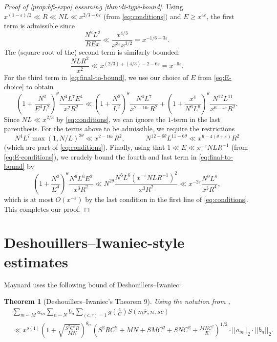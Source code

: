 \documentclass[reqno,11pt]{amsart}
\newtheorem{theorem}{Theorem}[section]
\theoremstyle{definition}
\theoremstyle{remark}
\numberwithin{equation}{section}
\newcommand{\eps}{\varepsilon}
\renewcommand{\bar}{\overline}
\begin{document}
\begin{proof}[Proof of \cref{prop:bfi-expo} assuming \cref{thm:di-type-bound}]
Using $x^{(1-\eps)/2} \ll R \ll NL \ll x^{2/3 - 6\eps}$ (from \cref{eq:conditions}) and $E \ge x^{4\eps}$, the first term is admissible since
\[
    \frac{N^2 L^2}{REx} \ll \frac{x^{4/3}}{x^{3\eps} x^{3/2}}
    =
    x^{-1/6 - 3\eps}.
\]
The (square root of the) second term is similarly bounded:
\[
    \frac{NL R^2}{x^2} \ll x^{(2/3) + (4/3) - 2 - 6\eps} = x^{- 6\eps}. 
\]
For the third term in \cref{eq:final-to-bound}, we use our choice of $E$ from \cref{eq:E-choice} to obtain
\[
    \left(1 + \frac{N^2}{E^4 L^2}\right)^{\theta} \frac{N^4 L^7 E^4}{x^2 R^2}
    \ll 
    \left(1 + \frac{N^2}{L^2}\right)^{\theta} \frac{N^4 L^7}{x^{2-16\eps} R^2}
    +
    \left(1 + \frac{x^4}{N^6 L^6}\right)^{\theta} \frac{N^{12} L^{11}}{x^{6-4\eps} R^2}.
\]
Since $NL \ll x^{2/3}$ by \cref{eq:conditions}, we can ignore the $1$-term in the last parenthesis. For the terms above to be admissible, we require the restrictions
\[
    N^4 L^7 \max(1, N/L)^{2\theta} \ll x^{2-16\eps}R^2, 
    \qquad\quad 
    N^{12-6\theta} L^{11-6\theta} \ll x^{6-4(\theta+\eps)} R^2
\]
(which are part of \cref{eq:conditions}). Finally, using that $1 \ll E \ll x^{-\eps} NLR^{-1}$ (from \cref{eq:E-conditions}), we crudely bound the fourth and last term in \cref{eq:final-to-bound} by
\[
    \left(1 + \frac{N^2}{E^4}\right)^{\theta} \frac{N^6 L^6 E^2}{x^3 R^2}
    \ll 
    N^{2\theta} \frac{N^6 L^6 (x^{-\eps}NLR^{-1})^2}{x^3 R^2}
    \ll
    x^{-2\eps} \frac{N^9 L^8}{x^3 R^4},
\]
which is at most $O(x^{-\eps})$ by the last condition in the first line of \cref{eq:conditions}. This completes our proof.
\end{proof}






\section{Deshouillers--Iwaniec-style estimates} \label{sec:deshouillers-iwaniec}

\iffalse
Maynard uses the following bound of Deshouillers--Iwaniec:

\begin{theorem}[Deshouillers--Iwaniec's Theorem 9] \label{thm:DI-thm9}
Using the notation from \cite[Lemma 18.1]{maynard2020primes},
\[
\begin{aligned}
    &\sum_{m \sim M} a_m \sum_{n \sim N} b_n
    \sum_{(c, r) = 1} g\left(\frac{c}{C}\right) S(m\bar{r}, n, sc)
    \\
    &\ll 
    x^{o(1)}
    \left(1 + \sqrt{\frac{S^2 C^2 R}{MN}}\right)^{\theta_{rs}}
    \left(S^2 R C^2 + MN + SMC^2 + SNC^2 + \frac{MN C^2}{R}\right)^{1/2}
    \cdot ||a_m||_2 
    \cdot ||b_n||_2.
\end{aligned}
\]
\end{theorem}
\end{document}
